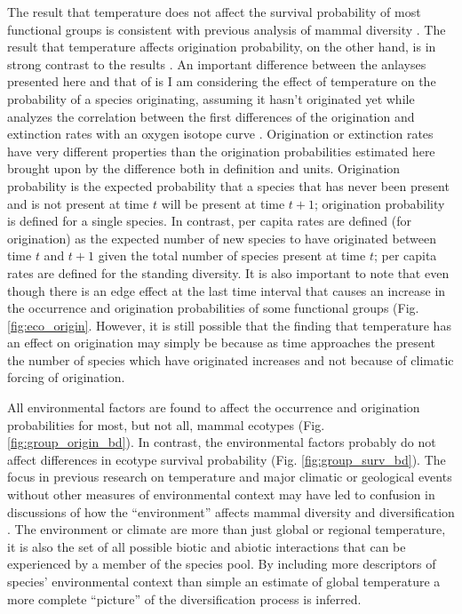 \documentclass[12pt,letterpaper]{article}
\begin{document}
The result that temperature does not affect the survival probability of most functional groups is consistent with previous analysis of mammal diversity \citep{Alroy2000g}. The result that temperature affects origination probability, on the other hand, is in strong contrast to the results \citet{Alroy2000g}. An important difference between the anlayses presented here and that of \citet{Alroy2000g} is I am considering the effect of temperature on the probability of a species originating, assuming it hasn't originated yet while \citet{Alroy2000g} analyzes the correlation between the first differences of the origination and extinction rates with an oxygen isotope curve \citep{Zachos2001}. Origination or extinction rates have very different properties than the origination probabilities estimated here brought upon by the difference both in definition and units. Origination probability is the expected probability that a species that has never been present and is not present at time \(t\) will be present at time \(t + 1\); origination probability is defined for a single species. In contrast, per capita rates are defined (for origination) as the expected number of new species to have originated between time \(t\) and \(t + 1\) given the total number of species present at time \(t\); per capita rates are defined for the standing diversity. It is also important to note that even though there is an edge effect at the last time interval that causes an increase in the occurrence and origination probabilities of some functional groups (Fig. \ref{fig:eco_origin}. However, it is still possible that the finding that temperature has an effect on origination may simply be because as time approaches the present the number of species which have originated increases and not because of climatic forcing of origination. 

All environmental factors are found to affect the occurrence and origination probabilities for most, but not all, mammal ecotypes (Fig. \ref{fig:group_origin_bd}). In contrast, the environmental factors probably do not affect differences in ecotype survival probability (Fig. \ref{fig:group_surv_bd}). The focus in previous research on temperature and major climatic or geological events without other measures of environmental context may have led to confusion in discussions of how the ``environment'' affects mammal diversity and diversification \citep{Alroy2000g,Figueirido2012}. The environment or climate are more than just global or regional temperature, it is also the set of all possible biotic and abiotic interactions that can be experienced by a member of the species pool. By including more descriptors of species' environmental context than simple an estimate of global temperature a more complete ``picture'' of the diversification process is inferred.
\end{document}
